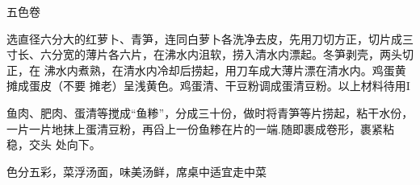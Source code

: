 \begin{recipe}{五色卷}

\ingredients



\cooking

\step 选直径六分大的红萝卜、青笋，连同白萝卜各洗净去皮，先用刀切方正，切片成三
寸长、六分宽的薄片各六片，在沸水内沮软，捞入清水内漂起。冬笋剥壳，两头切正，在
沸水内煮熟，在清水内冷却后捞起，用刀车成大薄片漂在清水内。鸡蛋黄摊成蛋皮（不要
摊老）呈浅黄色。鸡蛋清、干豆粉调成蛋清豆粉。以上材料待用I

\step 鱼肉、肥肉、蛋清等搅成“鱼糁”，分成三十份，做时将青笋等片捞起，粘干水份，
一片一片地抹上蛋清豆粉，再舀上一份鱼糁在片的一端.随即裹成卷形，裹紧粘稳，交头
处向下。

\features

色分五彩，菜浮汤面，味美汤鲜，席桌中适宜走中菜

\end{recipe}

